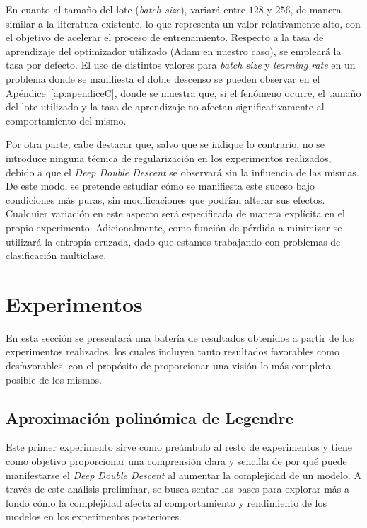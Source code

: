 En cuanto al tamaño del lote (\textit{batch size}), variará entre $128$ y $256$, de manera similar a la literatura existente, lo que representa un valor relativamente alto, con el objetivo de acelerar el proceso de entrenamiento. Respecto a la tasa de aprendizaje del optimizador utilizado (Adam en nuestro caso), se empleará la tasa por defecto. El uso de distintos valores para \textit{batch size} y \textit{learning rate} en un problema donde se manifiesta el doble descenso se pueden observar en el Apéndice~\ref{ap:apendiceC}, donde se muestra que, si el fenómeno ocurre, el tamaño del lote utilizado y la tasa de aprendizaje no afectan significativamente al comportamiento del mismo.\newline

Por otra parte, cabe destacar que, salvo que se indique lo contrario, no se introduce ninguna técnica de regularización en los experimentos realizados, debido a que el \textit{Deep Double Descent} se observará sin la influencia de las mismas. De este modo, se pretende estudiar cómo se manifiesta este suceso bajo condiciones más puras, sin modificaciones que podrían alterar sus efectos. Cualquier variación en este aspecto será especificada de manera explícita en el propio experimento. Adicionalmente, como función de pérdida a minimizar se utilizará la entropía cruzada, dado que estamos trabajando con problemas de clasificación multiclase.\newline

\section{Experimentos}\label{sec:experimentos}

En esta sección se presentará una batería de resultados obtenidos a partir de los experimentos realizados, los cuales incluyen tanto resultados favorables como desfavorables, con el propósito de proporcionar una visión lo más completa posible de los mismos.\newline

\subsection{Aproximación polinómica de Legendre}\label{subsec:approx-legendre1}

Este primer experimento sirve como preámbulo al resto de experimentos y tiene como objetivo proporcionar una comprensión clara y sencilla de por qué puede manifestarse el \textit{Deep Double Descent} al aumentar la complejidad de un modelo. A través de este análisis preliminar, se busca sentar las bases para explorar más a fondo cómo la complejidad afecta al comportamiento y rendimiento de los modelos en los experimentos posteriores.\newline

